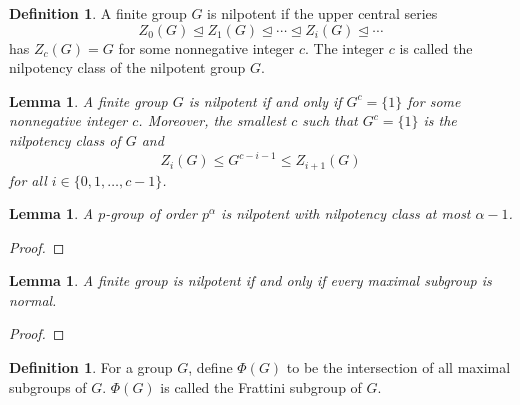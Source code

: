 \documentclass{dcthesis}
\newcommand{\defi}[1]{\textsf{#1}}
\numberwithin{equation}{section}
\newtheorem{lemma}[equation]{Lemma}
\theoremstyle{definition}
\newtheorem{definition}[equation]{Definition}
\theoremstyle{remark}
\begin{document}
{{    \begin{definition}
      \label{def:nilpotentgroup}
      A finite group $G$ is \defi{nilpotent}
      if the upper central series
      \[
        Z_0(G)\trianglelefteq Z_1(G)\trianglelefteq\cdots\trianglelefteq Z_{i}(G)\trianglelefteq\cdots
      \]
      has $Z_c(G) = G$ for some nonnegative integer $c$.
      The integer $c$ is called the \defi{nilpotency class} of
      the nilpotent group $G$.
    \end{definition}
    \begin{lemma}
      \label{lem:upperlowernilpotent}
      A finite group $G$ is nilpotent if and only if
      $G^c=\{1\}$ for some nonnegative integer $c$.
      Moreover,
      the smallest $c$ such that $G^c=\{1\}$
      is the nilpotency class of $G$ and
      \[
        Z_i(G)\leq G^{c-i-1}\leq Z_{i+1}(G)
      \]
      for all $i\in \{0,1,\dots,c-1\}$.
    \end{lemma}
    \begin{lemma}
      A $p$-group of order $p^\alpha$ is nilpotent with nilpotency class
      at most $\alpha-1$.
    \end{lemma}
    \begin{proof}
    \end{proof}
    \begin{lemma}
      A finite group is nilpotent if and only if
      every maximal subgroup is normal.
    \end{lemma}
    \begin{proof}
    \end{proof}
    \begin{definition}
      \label{def:frattinisubgroup}
      For a group $G$,
      define $\Phi(G)$
      to be the intersection of all maximal subgroups of $G$.
      $\Phi(G)$ is called the
      \defi{Frattini subgroup of $G$}.
    \end{definition}
  }
}
\end{document}
